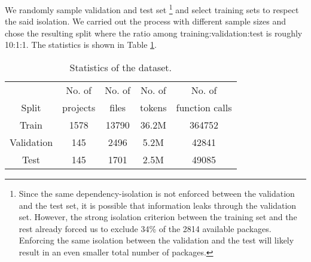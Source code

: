 We randomly sample validation and test set
\ifamlc%
\footnote{
Since the same dependency-isolation is not enforced between the validation and the test set, it is possible that information leaks through the validation set. 
However, the strong isolation criterion between the training set and the rest already forced us to exclude 34\% of the 2814 available packages. 
Enforcing the same isolation between the validation and the test will likely result in an even smaller total number of packages.
}%
\fi%
and select training sets to respect the said isolation.
We carried out the process with different sample sizes and chose the resulting split where the ratio among training:validation:test is roughly 10:1:1. 
The statistics is shown in Table \ref{tab:generalstat}. 

\ifaaai
\begin{table}[ht]
\centering
\begin{tabular}{ccccc}
\toprule
{} & No. of  & No. of  & No. of  & No. of  \\
Split & projects & files & tokens & function calls \\
\midrule
Train & 1578 & 13790    & 36.2M  & 364752 \\
Validation   & 145  & 2496     & 5.2M   & 42841  \\
Test  & 145  & 1701     & 2.5M   & 49085  \\   
\bottomrule
\end{tabular}
\caption{Statistics of the \CallArgs dataset. }
\label{tab:generalstat}
\end{table}
\fi

\ifaaai
\fi
